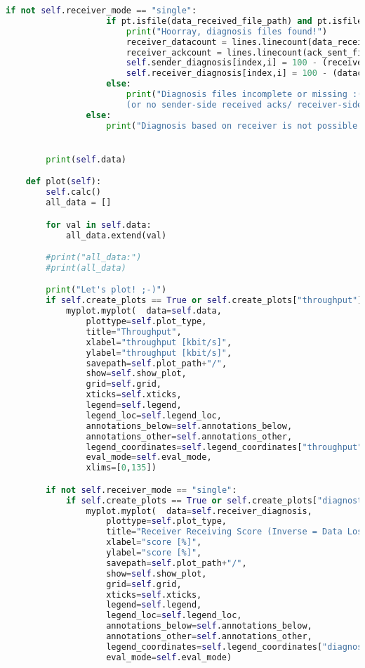 \begin{lstlisting}[language=Python,caption=sniffer.py]
                if not self.receiver_mode == "single":
                    if pt.isfile(data_received_file_path) and pt.isfile(ack_sent_file_path) and datacount > 0 and ackcount > 0:
                        print("Hoorray, diagnosis files found!")
                        receiver_datacount = lines.linecount(data_received_file_path)
                        receiver_ackcount = lines.linecount(ack_sent_file_path)
                        self.sender_diagnosis[index,i] = 100 - (receiver_ackcount - ackcount)/receiver_ackcount*100
                        self.receiver_diagnosis[index,i] = 100 - (datacount - receiver_datacount)/datacount*100
                    else:
                        print("Diagnosis files incomplete or missing :( \
                        (or no sender-side received acks/ receiver-side received data)!")
                else:
                    print("Diagnosis based on receiver is not possible in a single receiver, multiple sender scenario.")


        print(self.data)

    def plot(self):
        self.calc()
        all_data = []

        for val in self.data:
            all_data.extend(val)

        #print("all_data:")
        #print(all_data)

        print("Let's plot! ;-)")
        if self.create_plots == True or self.create_plots["throughput"] == True:
            myplot.myplot(  data=self.data,
                plottype=self.plot_type,
                title="Throughput",
                xlabel="throughput [kbit/s]",
                ylabel="throughput [kbit/s]",
                savepath=self.plot_path+"/",
                show=self.show_plot,
                grid=self.grid,
                xticks=self.xticks,
                legend=self.legend,
                legend_loc=self.legend_loc,
                annotations_below=self.annotations_below,
                annotations_other=self.annotations_other,
                legend_coordinates=self.legend_coordinates["throughput"],
                eval_mode=self.eval_mode,
                xlims=[0,135])

        if not self.receiver_mode == "single":
            if self.create_plots == True or self.create_plots["diagnostic"] == True:
                myplot.myplot(  data=self.receiver_diagnosis,
                    plottype=self.plot_type,
                    title="Receiver Receiving Score (Inverse = Data Loss)",
                    xlabel="score [%]",
                    ylabel="score [%]",
                    savepath=self.plot_path+"/",
                    show=self.show_plot,
                    grid=self.grid,
                    xticks=self.xticks,
                    legend=self.legend,
                    legend_loc=self.legend_loc,
                    annotations_below=self.annotations_below,
                    annotations_other=self.annotations_other,
                    legend_coordinates=self.legend_coordinates["diagnosis_receiver"],
                    eval_mode=self.eval_mode)


\end{lstlisting}
